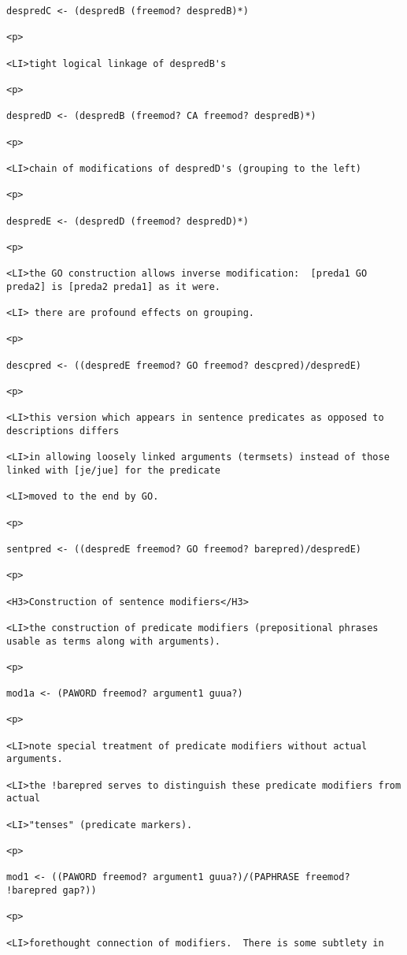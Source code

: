 \documentclass[12pt]{article}
\begin{document}
\begin{lstlisting}
despredC <- (despredB (freemod? despredB)*)

<p>

<LI>tight logical linkage of despredB's

<p>

despredD <- (despredB (freemod? CA freemod? despredB)*)

<p>

<LI>chain of modifications of despredD's (grouping to the left)

<p>

despredE <- (despredD (freemod? despredD)*)

<p>

<LI>the GO construction allows inverse modification:  [preda1 GO preda2] is [preda2 preda1] as it were.

<LI> there are profound effects on grouping.

<p>

descpred <- ((despredE freemod? GO freemod? descpred)/despredE)

<p>

<LI>this version which appears in sentence predicates as opposed to descriptions differs

<LI>in allowing loosely linked arguments (termsets) instead of those linked with [je/jue] for the predicate

<LI>moved to the end by GO.

<p>

sentpred <- ((despredE freemod? GO freemod? barepred)/despredE)

<p>

<H3>Construction of sentence modifiers</H3>

<LI>the construction of predicate modifiers (prepositional phrases usable as terms along with arguments).

<p>

mod1a <- (PAWORD freemod? argument1 guua?)

<p>

<LI>note special treatment of predicate modifiers without actual arguments.

<LI>the !barepred serves to distinguish these predicate modifiers from actual

<LI>"tenses" (predicate markers).

<p>

mod1 <- ((PAWORD freemod? argument1 guua?)/(PAPHRASE freemod? !barepred gap?))

<p>

<LI>forethought connection of modifiers.  There is some subtlety in


\end{lstlisting}
\end{document}
